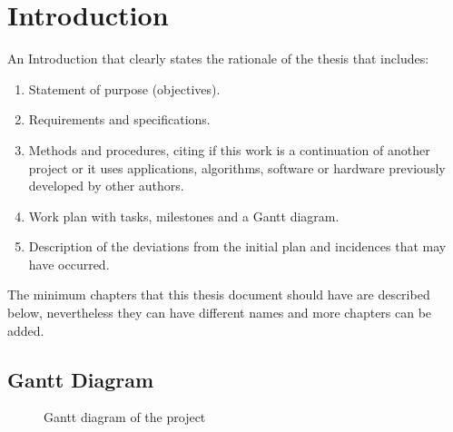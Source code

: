 \clearpage\section{Introduction}

{An Introduction that clearly states the rationale of the thesis that includes:}

\begin{enumerate}
\item {Statement of purpose (objectives).}
\item {Requirements and specifications.}
\item {Methods and procedures, citing if this work is a continuation of another project or it uses applications, algorithms,
software or hardware previously developed by other authors.}
\item {Work plan with tasks, milestones and a Gantt diagram.}

\item {Description of the deviations from the initial plan and incidences that may have occurred. }
\end{enumerate}

\bigskip

{The minimum chapters that this thesis document should have are described below, nevertheless they can have different
names and more chapters can be added.}


\bigskip

\subsection{Gantt Diagram}
\label{ssec:gantt}
\begin{figure}[H]
    \centering
    
    \caption[Project's Gantt diagram]{\footnotesize{Gantt diagram of the project}}
    \label{fig:gantt}
\end{figure}

\bigskip

